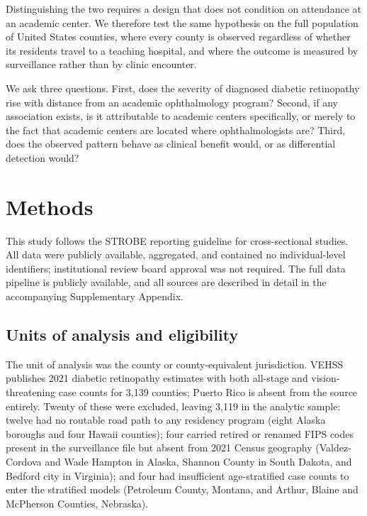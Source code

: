 \documentclass[11pt]{article}
\begin{document}
Distinguishing the two requires a design that does not condition on attendance
at an academic center. We therefore test the same hypothesis on the full
population of United States counties, where every county is observed regardless
of whether its residents travel to a teaching hospital, and where the outcome is
measured by surveillance rather than by clinic encounter.

We ask three questions. First, does the severity of diagnosed diabetic
retinopathy rise with distance from an academic ophthalmology program? Second,
if any association exists, is it attributable to academic centers specifically,
or merely to the fact that academic centers are located where ophthalmologists
are? Third, does the observed pattern behave as clinical benefit would, or as
differential detection would?

\section{Methods}

This study follows the STROBE reporting guideline for cross-sectional studies.
All data were publicly available, aggregated, and contained no individual-level
identifiers; institutional review board approval was not required. The full data
pipeline is publicly available, and all sources are described in detail in the
accompanying Supplementary Appendix.

\subsection{Units of analysis and eligibility}

The unit of analysis was the county or county-equivalent jurisdiction. VEHSS
publishes 2021 diabetic retinopathy estimates with both all-stage and
vision-threatening case counts for 3,139 counties; Puerto Rico is absent from
the source entirely. Twenty of these were excluded, leaving 3,119 in the
analytic sample: twelve had no routable road path to any residency program
(eight Alaska boroughs and four Hawaii counties); four carried retired or
renamed FIPS codes present in the surveillance file but absent from 2021
Census geography (Valdez-Cordova and Wade Hampton in Alaska, Shannon County in
South Dakota, and Bedford city in Virginia); and four had insufficient
age-stratified case counts to enter the stratified models (Petroleum County,
Montana, and Arthur, Blaine and McPherson Counties, Nebraska).
\end{document}
